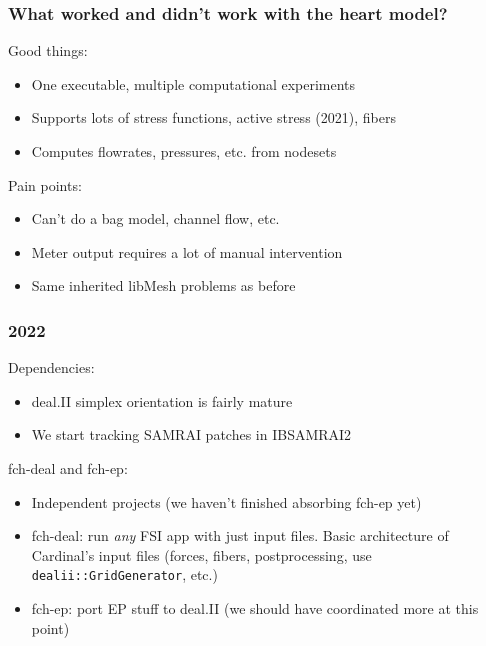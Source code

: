 \documentclass[8pt]{beamer}
\begin{document}
\begin{frame}
  \frametitle{What worked and didn't work with the heart model?}
  Good things:
  \begin{itemize}
    \item[$\blacksquare$] One executable, multiple computational experiments
    \item[$\blacksquare$] Supports lots of stress functions, active stress (2021), fibers
    \item[$\blacksquare$] Computes flowrates, pressures, etc. from nodesets
  \end{itemize}
  \vfill

  Pain points:
  \begin{itemize}
    \item[$\blacksquare$] Can't do a bag model, channel flow, etc.
    \item[$\blacksquare$] Meter output requires a lot of manual intervention
    \item[$\blacksquare$] Same inherited libMesh problems as before
  \end{itemize}
\end{frame}

\begin{frame}
  \frametitle{2022}
  Dependencies:
  \begin{itemize}
    \item[$\blacksquare$] deal.II simplex orientation is fairly mature
    \item[$\blacksquare$] We start tracking SAMRAI patches in IBSAMRAI2
  \end{itemize}
  \vfill

  fch-deal and fch-ep:
  \begin{itemize}
    \item[$\blacksquare$] Independent projects (we haven't finished absorbing fch-ep yet)
    \item[$\blacksquare$] fch-deal: run \emph{any} FSI app with just input files. Basic architecture of Cardinal's input files (forces, fibers, postprocessing, use \texttt{dealii::GridGenerator}, etc.)
    \item[$\blacksquare$] fch-ep: port EP stuff to deal.II (we should have coordinated more at
      this point)
  \end{itemize}
\end{frame}
\end{document}
